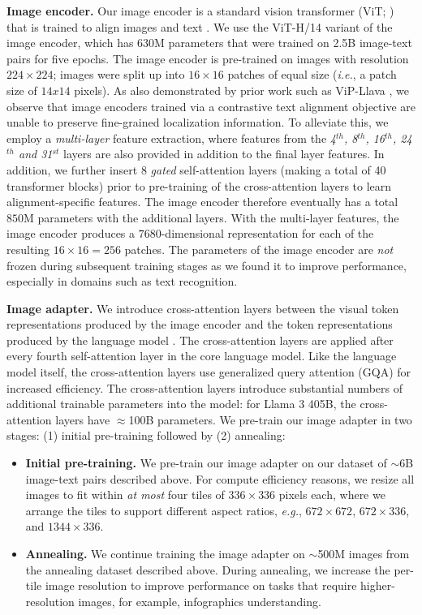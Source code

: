 \documentclass[dvipsnames]{fairmeta}
\begin{document}
\textbf{Image encoder.} Our image encoder is a standard vision transformer (ViT; \citet{dosovitskiy2020vit}) that is trained to align images and text \citep{xu2023demystifying}.
We use the ViT-H/14 variant of the image encoder, which has 630M parameters that were trained on 2.5B image-text pairs for five epochs.
The image encoder is pre-trained on images with resolution $224 \times 224$; images were split up into $16 \times 16$ patches of equal size (\emph{i.e.}, a patch size of $14x14$ pixels).
As also demonstrated by prior work such as ViP-Llava \citep{cai2023vipllava}, we observe that image encoders trained via a contrastive text alignment objective are unable to preserve fine-grained localization information. To alleviate this, we employ a \emph{multi-layer} feature extraction, where features from the \emph{4$^{th}$, 8$^{th}$, 16$^{th}$, 24$^{th}$ and 31$^{st}$} layers are also provided in addition to the final layer features.
In addition, we further insert 8 \emph{gated} self-attention layers (making a total of 40 transformer blocks) prior to pre-training of the cross-attention layers to learn alignment-specific features. The image encoder therefore eventually has a total $850$M parameters with the additional layers.
With the multi-layer features, the image encoder produces a $7680$-dimensional representation for each of the resulting $16 \times 16\!=\!256$ patches.
The parameters of the image encoder are \emph{not} frozen during subsequent training stages as we found it to improve performance, especially in domains such as text recognition.

\textbf{Image adapter.} We introduce cross-attention layers between the visual token representations produced by the image encoder and the token representations produced by the language model \citep{alayrac2022flamingo}.
The cross-attention layers are applied after every fourth self-attention layer in the core language model.
Like the language model itself, the cross-attention layers use generalized query attention (GQA) for increased efficiency.
The cross-attention layers introduce substantial numbers of additional trainable parameters into the model: for Llama 3 405B, the cross-attention layers have $\approx$100B parameters.
We pre-train our image adapter in two stages: (1) initial pre-training followed by (2) annealing:
\begin{itemize}
\item \textbf{Initial pre-training.} We pre-train our image adapter on our dataset of  $\sim$6B image-text pairs described above.
For compute efficiency reasons, we resize all images to fit within \emph{at most} four tiles of $336 \times 336$ pixels each, where we arrange the tiles to support different aspect ratios, \emph{e.g.}, $672 \times 672$, $672 \times 336$, and $1344 \times 336$.

\item \textbf{Annealing.}
We continue training the image adapter on $\sim$500M images from the annealing dataset described above.
During annealing, we increase the per-tile image resolution to improve performance on tasks that require higher-resolution images, for example, infographics understanding.
\end{itemize}
\end{document}
